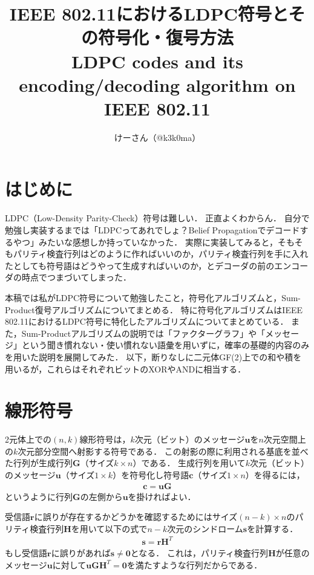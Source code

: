 \documentclass[twocolumn, a4paper]{ieicejsp}
\title{{\bf  IEEE 802.11におけるLDPC符号とその符号化・復号方法
        }
  {\normalsize \\ LDPC codes and its encoding/decoding algorithm on IEEE 802.11}}
\author{けーさん（@k3k0ma）}
\begin{document}
\maketitle

\section{はじめに}

LDPC（Low-Density Parity-Check）符号は難しい．
正直よくわからん．
自分で勉強し実装するまでは「LDPCってあれでしょ？Belief Propagationでデコードするやつ」みたいな感想しか持っていなかった．
実際に実装してみると，そもそもパリティ検査行列はどのように作ればいいのか，パリティ検査行列を手に入れたとしても符号語はどうやって生成すればいいのか，とデコーダの前のエンコーダの時点でつまづいてしまった．

本稿では私がLDPC符号について勉強したこと，符号化アルゴリズムと，Sum-Product復号アルゴリズムについてまとめる．
特に符号化アルゴリズムはIEEE 802.11におけるLDPC符号に特化したアルゴリズムについてまとめている．
また，Sum-Productアルゴリズムの説明では「ファクターグラフ」や「メッセージ」という聞き慣れない・使い慣れない語彙を用いずに，確率の基礎的内容のみを用いた説明を展開してみた．
以下，断りなしに二元体GF(2)上での和や積を用いるが，これらはそれぞれビットのXORやANDに相当する．

\section{線形符号}

2元体上での$(n,k)$線形符号は，$k$次元（ビット）のメッセージ$\mathbf{u}$を$n$次元空間上の$k$次元部分空間へ射影する符号である．
この射影の際に利用される基底を並べた行列が生成行列$\mathbf{G}$（サイズ$k \times n$）である．
生成行列を用いて$k$次元（ビット）のメッセージ$\mathbf{u}$（サイズ$1 \times k$）を符号化し符号語$\mathbf{c}$（サイズ$1 \times n$）を得るには，
\begin{align}
  \mathbf{c} = \mathbf{u} \mathbf{G}
\end{align}
というように行列$\mathbf{G}$の左側から$\mathbf{u}$を掛ければよい．

受信語$\mathbf{r}$に誤りが存在するかどうかを確認するためにはサイズ$(n-k)\times n$のパリティ検査行列$\mathbf{H}$を用いて以下の式で$n-k$次元のシンドローム$\mathbf{s}$を計算する．
\begin{align}
  \mathbf{s} = \mathbf{r} \mathbf{H}^T
\end{align}
もし受信語$\mathbf{r}$に誤りがあれば$\mathbf{s}\not=\mathbf{0}$となる．
これは，パリティ検査行列$\mathbf{H}$が任意のメッセージ$\mathbf{u}$に対して$\mathbf{u}\mathbf{G}\mathbf{H}^T = \mathbf{0}$を満たすような行列だからである．
\end{document}
